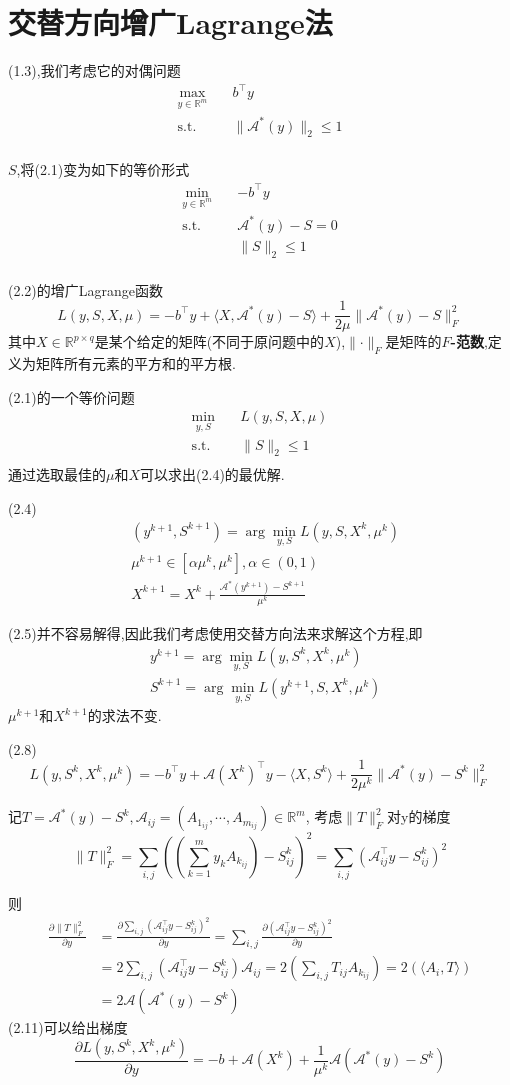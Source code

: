 \documentclass[UTF8]{ctexart}
\newcommand{\s}{\quad}
\renewcommand{\b}{\textbf}
\newcommand{\p}{\paragraph{}\s}
\newcommand{\sect}{\section}
\newcommand{\equSplit}[1]{\begin{equation}\begin{split}#1\end{split}\end{equation}}
\newcommand{\equAlign}[1]{\begin{align}#1\end{align}}
\newcommand{\equ}[1]{\begin{equation}#1\end{equation}}
\newcommand{\Tst}{\text{s.t.}\s}
\newcommand{\norm}[1]{\lVert#1\rVert}
\newcommand{\inprod}[1]{\langle#1\rangle}
\newcommand{\Real}[1]{\mathbb{R}^{#1}}
\newcommand{\nunorm}{\norm{X}_*}
\newcommand{\Ma}{\mathcal{A}}
\newcommand{\partD}[2]{\frac{\partial#1}{\partial#2}}
\numberwithin{equation}{section}
\begin{document}
\sect{交替方向增广Lagrange法}
(1.3),我们考虑它的对偶问题
\equSplit{
	\max_{y\in\Real{m}}\s&b^\top y\\
	\Tst&\norm{\Ma^*(y)}_2\leq1\\
}

$S$,将(2.1)变为如下的等价形式
\equSplit{
	\min_{y\in\Real{m}}\s&-b^\top y\\
	\Tst&\Ma^*(y)-S=0\\
	&\norm{S}_2\leq1\\
}

(2.2)的增广Lagrange函数
\equ{L(y,S,X,\mu)=-b^\top y+\inprod{X,\Ma^*(y)-S}+\frac{1}{2\mu}\norm{\Ma^*(y)-S}^2_F}
其中$X\in\Real{p\times q}$是某个给定的矩阵(不同于原问题中的$X$),$\norm{\cdot}_F$是矩阵的\b{$F$-范数},定义为矩阵所有元素的平方和的平方根.

(2.1)的一个等价问题
\equSplit{
	\min_{y,S}\s&L(y,S,X,\mu)\\
	\Tst&\norm{S}_2\leq1\\
}
通过选取最佳的$\mu$和$X$可以求出(2.4)的最优解.

(2.4)
\equAlign{
	&(y^{k+1},S^{k+1})=\arg\min_{y,S}L(y,S,X^k,\mu^k)\\
	&\mu^{k+1}\in[\alpha\mu^k,\mu^k],\alpha\in(0,1)\\
	&X^{k+1}=X^k+\frac{\Ma^*(y^{k+1})-S^{k+1}}{\mu^k}
}

(2.5)并不容易解得,因此我们考虑使用交替方向法来求解这个方程,即
\equAlign{
	&y^{k+1}=\arg\min_{y,S}L(y,S^k,X^k,\mu^k)\\
	&S^{k+1}=\arg\min_{y,S}L(y^{k+1},S,X^k,\mu^k)
}
$\mu^{k+1}$和$X^{k+1}$的求法不变.

(2.8)
\equ{L(y,S^k,X^k,\mu^k)=-b^\top y+\Ma(X^k)^\top y-\inprod{X,S^k}+\frac{1}{2\mu^k}\norm{\Ma^*(y)-S^k}^2_F}

记$T=\Ma^*(y)-S^k,\Ma_{ij}=(A_{1_{ij}},\cdots,A_{m_{ij}})\in\Real{m}$,
考虑$\norm{T}^2_F$对y的梯度
\[\norm{T}^2_F=\sum_{i,j}((\sum^m_{k=1}y_kA_{k_{ij}})-S^k_{ij})^2=\sum_{i,j}(\Ma_{ij}^\top y-S^k_{ij})^2\]

则
\equ{
	\begin{aligned}
		\partD{\norm{T}^2_F}{y} & =\partD{\sum_{i,j}(\Ma_{ij}^\top y-S^k_{ij})^2}{y}=\sum_{i,j}\partD{(\Ma_{ij}^\top y-S^k_{ij})^2}{y} \\
		                        & =2\sum_{i,j}(\Ma_{ij}^\top y-S^k_{ij})\Ma_{ij}=2(\sum_{i,j}T_{ij}A_{k_{ij}})=2(\inprod{A_i,T})       \\
		                        & =2\Ma(\Ma^*(y)-S^k)
	\end{aligned}
}
(2.11)可以给出梯度
\equ{
	\partD{L(y,S^k,X^k,\mu^k)}{y}=-b+\Ma(X^k)+\frac{1}{\mu^k}\Ma(\Ma^*(y)-S^k)
}
\end{document}
